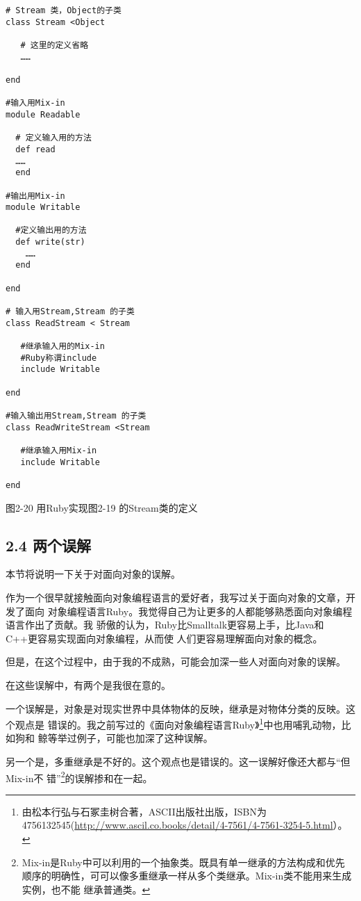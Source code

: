 \documentclass[11pt]{ctexart}
\begin{document}
\lstset{language=org,label= ,caption= ,captionpos=b,numbers=none}
\begin{lstlisting}
# Stream 类，Object的子类
class Stream <Object

   # 这里的定义省略
   ……

end

#输入用Mix-in
module Readable

  # 定义输入用的方法
  def read
  ……
  end

#输出用Mix-in 
module Writable

  #定义输出用的方法
  def write(str)
    ……
  end

end

# 输入用Stream,Stream 的子类
class ReadStream < Stream

   #继承输入用的Mix-in
   #Ruby称谓include
   include Writable

end

#输入输出用Stream,Stream 的子类
class ReadWriteStream <Stream

   #继承输入用Mix-in
   include Writable

end

\end{lstlisting}

图2-20 用Ruby实现图2-19 的Stream类的定义
\subsection{2.4 两个误解}
\label{sec:org267d057}

本节将说明一下关于对面向对象的误解。

作为一个很早就接触面向对象编程语言的爱好者，我写过关于面向对象的文章，开发了面向
对象编程语言Ruby。我觉得自己为让更多的人都能够熟悉面向对象编程语言作出了贡献。我
骄傲的认为，Ruby比Smalltalk更容易上手，比Java和C++更容易实现面向对象编程，从而使
人们更容易理解面向对象的概念。

但是，在这个过程中，由于我的不成熟，可能会加深一些人对面向对象的误解。

在这些误解中，有两个是我很在意的。

一个误解是，对象是对现实世界中具体物体的反映，继承是对物体分类的反映。这个观点是
错误的。我之前写过的《面向对象编程语言Ruby》\footnote{由松本行弘与石冢圭树合著，ASCII出版社出版，ISBN为
4756132545(\url{http://www.ascil.co.books/detail/4-7561/4-7561-3254-5.html}）。}中也用哺乳动物，比如狗和
鲸等举过例子，可能也加深了这种误解。

另一个是，多重继承是不好的。这个观点也是错误的。这一误解好像还大都与“但Mix-in不
错”\footnote{Mix-in是Ruby中可以利用的一个抽象类。既具有单一继承的方法构成和优先
顺序的明确性，可可以像多重继承一样从多个类继承。Mix-in类不能用来生成实例，也不能
继承普通类。}的误解掺和在一起。
\end{document}
